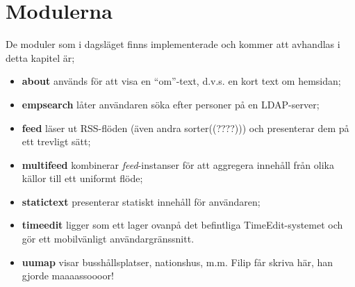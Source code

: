 \section{Modulerna}
De moduler som i dagsläget finns implementerade och kommer att avhandlas
i detta kapitel är;

\begin{itemize}
  \item {\bf about} används för att visa en ``om''-text, d.v.s. en kort
    text om hemsidan;

  \item {\bf empsearch} låter användaren söka efter personer på en
    LDAP-server;

  \item {\bf feed} läser ut RSS-flöden (även andra sorter((????))) och
    presenterar dem på ett trevligt sätt;

  \item {\bf multifeed} kombinerar \emph{feed}-instanser för att
    aggregera innehåll från olika källor till ett uniformt flöde;

  \item {\bf statictext} presenterar statiskt innehåll för användaren;

  \item {\bf timeedit} ligger som ett lager ovanpå det befintliga
    TimeEdit-systemet och gör ett mobilvänligt användargränssnitt.

  \item {\bf uumap} visar busshållsplatser, nationshus, m.m. Filip får
    skriva här, han gjorde maaaassoooor!
\end{itemize}

%
%
%
%
%

%

